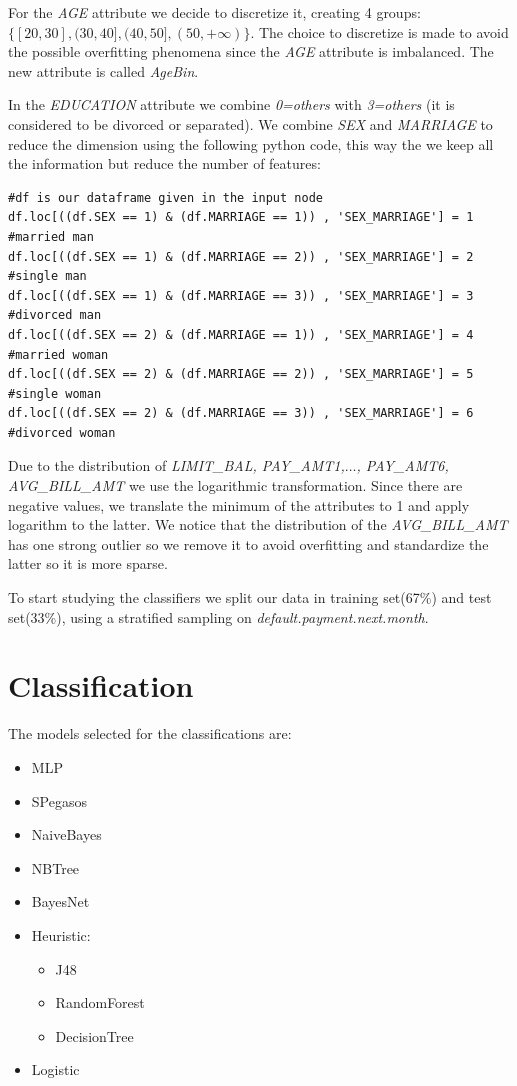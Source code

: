 \documentclass[fleqn,10pt]{SelfArx} %
\begin{document}
	For the \textit{AGE} attribute we decide to discretize it, creating 4 groups: $\{[20,30],(30,40],(40,50],(50,+\infty)\}$.
	The choice to discretize is made to avoid the possible overfitting phenomena since the \textit{AGE} attribute is imbalanced. The new attribute is called \textit{AgeBin}.
	
	In the \textit{EDUCATION} attribute we combine \textit{0=others} with \textit{3=others} (it is considered to be divorced or separated).
	We combine \textit{SEX} and \textit{MARRIAGE} to reduce the dimension using the following python code, this way the we keep all the information but reduce the number of features:
	
		
\begin{lstlisting}
#df is our dataframe given in the input node
df.loc[((df.SEX == 1) & (df.MARRIAGE == 1)) , 'SEX_MARRIAGE'] = 1 #married man
df.loc[((df.SEX == 1) & (df.MARRIAGE == 2)) , 'SEX_MARRIAGE'] = 2 #single man
df.loc[((df.SEX == 1) & (df.MARRIAGE == 3)) , 'SEX_MARRIAGE'] = 3 #divorced man
df.loc[((df.SEX == 2) & (df.MARRIAGE == 1)) , 'SEX_MARRIAGE'] = 4 #married woman
df.loc[((df.SEX == 2) & (df.MARRIAGE == 2)) , 'SEX_MARRIAGE'] = 5 #single woman
df.loc[((df.SEX == 2) & (df.MARRIAGE == 3)) , 'SEX_MARRIAGE'] = 6 #divorced woman
\end{lstlisting}
	
	Due to the distribution of \textit{LIMIT\_BAL, PAY\_AMT1,$\hdots$, PAY\_AMT6, AVG\_BILL\_AMT} we use the logarithmic transformation. 
	Since there are negative values, we translate the minimum of the attributes to 1 and apply logarithm to the latter. 
	We notice that the distribution of the \textit{AVG\_BILL\_AMT} has one strong outlier so we remove it to avoid overfitting and standardize the latter so it is more sparse.
	
	To start studying the classifiers we split our data in training set(67\%) and test set(33\%), using a stratified sampling on \textit{default.payment.next.month}.
	
	\section{Classification}
	The models selected for the classifications are: 
	\begin{itemize}[noitemsep]
		\item MLP
		\item SPegasos
		\item NaiveBayes

		\item NBTree 
		\item BayesNet
		
		\item  Heuristic:
		\begin{itemize}[noitemsep]
			 \item J48
			 \item RandomForest
			 \item DecisionTree
		\end{itemize}
		
		\item Logistic
		
		
	\end{itemize}
\end{document}
